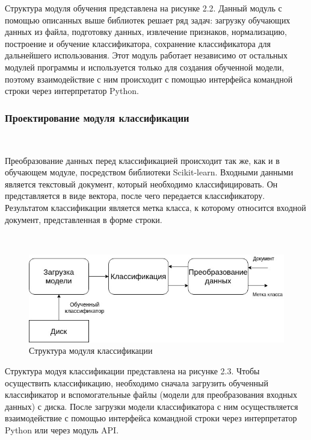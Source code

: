 Структура модуля обучения представлена на рисунке 2.2. Данный модуль с помощью описанных выше библиотек решает ряд задач: загрузку обучающих данных из файла, подготовку данных, извлечение признаков, нормализацию, построение и обучение классификатора, сохранение классификатора для дальнейшего использования. Этот модуль работает независимо от остальных модулей программы и используется только для создания обученной модели, поэтому взаимодействие с ним происходит с помощью интерфейса командной строки через интерпретатор Python. 

\newpage
\subsubsection{Проектирование модуля классификации}
\

Преобразование данных перед классификацией происходит так же, как и в обучающем модуле, посредством библиотеки Scikit-learn. Входными данными является текстовый документ, который необходимо классифицировать. Он представляется в виде вектора, после чего передается классификатору. Результатом классификации является метка класса, к которому относится входной документ, представленная в форме строки.

\

  \begin{figure}[h!]
    \centering
    \setlength{\fboxsep}{5pt}
    \includegraphics[width=.99\textwidth]{img/classification-module}
    \vspace*{6pt}
    \caption{Структура модуля классификации}\label{fig:project-tree}
  \end{figure}


Структура модуя классификации представлена на рисунке 2.3. Чтобы осуществить классификацию, необходимо сначала загрузить обученный классификатор и вспомогательные файлы (модели для преобразования входных данных) с диска. После загрузки модели классификатора с ним осуществляется взаимодействие с помощью интерфейса командной строки через интерпретатор Python или через модуль API.

